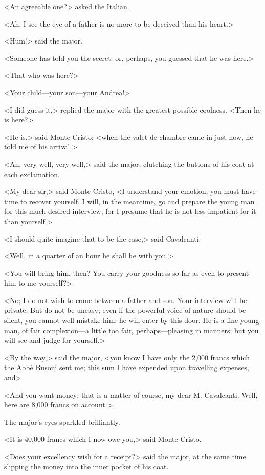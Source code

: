  <An agreeable one?> asked the Italian. 

 <Ah, I see the eye of a father is no more to be deceived than his heart.> 

 <Hum!> said the major. 

 <Someone has told you the secret; or, perhaps, you guessed that he was here.> 

 <That who was here?> 

 <Your child—your son—your Andrea!> 

 <I did guess it,> replied the major with the greatest possible coolness. <Then he is here?> 

 <He is,> said Monte Cristo; <when the valet de chambre came in just now, he told me of his arrival.> 

 <Ah, very well, very well,> said the major, clutching the buttons of his coat at each exclamation. 

 <My dear sir,> said Monte Cristo, <I understand your emotion; you must have time to recover yourself. I will, in the meantime, go and prepare the young man for this much-desired interview, for I presume that he is not less impatient for it than yourself.> 

 <I should quite imagine that to be the case,> said Cavalcanti. 

 <Well, in a quarter of an hour he shall be with you.> 

 <You will bring him, then? You carry your goodness so far as even to present him to me yourself?> 

 <No; I do not wish to come between a father and son. Your interview will be private. But do not be uneasy; even if the powerful voice of nature should be silent, you cannot well mistake him; he will enter by this door. He is a fine young man, of fair complexion—a little too fair, perhaps—pleasing in manners; but you will see and judge for yourself.> 

 <By the way,> said the major, <you know I have only the 2,000 francs which the Abbé Busoni sent me; this sum I have expended upon travelling expenses, and\longdash> 

 <And you want money; that is a matter of course, my dear M. Cavalcanti. Well, here are 8,000 francs on account.> 

 The major's eyes sparkled brilliantly. 

 <It is 40,000 francs which I now owe you,> said Monte Cristo. 

 <Does your excellency wish for a receipt?> said the major, at the same time slipping the money into the inner pocket of his coat. 

